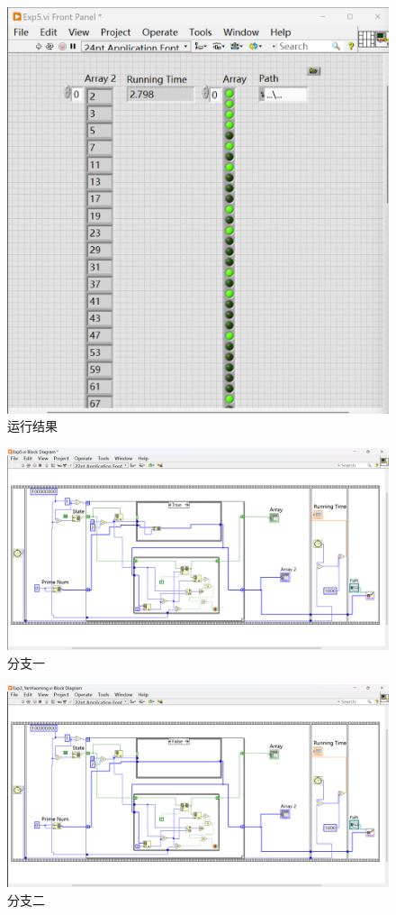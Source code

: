 \documentclass[UTF8]{ctexart}
\begin{document}
\begin{figure}
    \centering
    \includegraphics[width=1\linewidth]{运行效果.png}
    \caption{运行结果}
    \label{fig:entr-label}
\end{figure}

\begin{figure}
    \centering
    \includegraphics[width=1\linewidth]{LabView代码截图.png}
    \caption{分支一}
    \label{fig:enter-label}
\end{figure}

\begin{figure}
    \centering
    \includegraphics[width=1\linewidth]{LabView代码截图2.png}
    \caption{分支二}
    \label{fig:label}
\end{figure}
\end{document}
